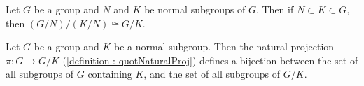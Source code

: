 \begin{theorem}
    \label{theorem : quotient_normal_cancel}
    Let $G$ be a group and $N$ and $K$ be normal subgroups of $G$. Then if $N
    \subset K \subset G$, then $(G/N)/(K/N) \cong G/K$.
\end{theorem}

\begin{theorem}
    \label{theorem : lattice}

    Let $G$ be a group and $K$ be a normal subgroup. Then the natural projection
    $\pi : G \rightarrow G/K$ (\ref{definition : quotNaturalProj}) defines a
    bijection between the set of all subgroups of $G$ containing $K$, and the
    set of all subgroups of $G/K$.
\end{theorem}
